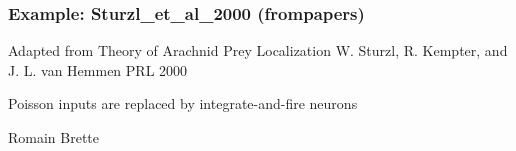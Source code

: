 \documentclass[letterpaper,10pt,english]{manual}
\begin{document}
\resetcurrentobjects
\hypertarget{--doc-examples-frompapers_Sturzl_et_al_2000}{}

\hypertarget{index-31}{}\subsubsection{Example: Sturzl\_et\_al\_2000 (frompapers)}

Adapted from
Theory of Arachnid Prey Localization
W. Sturzl, R. Kempter, and J. L. van Hemmen
PRL 2000

Poisson inputs are replaced by integrate-and-fire neurons

Romain Brette
\end{document}
